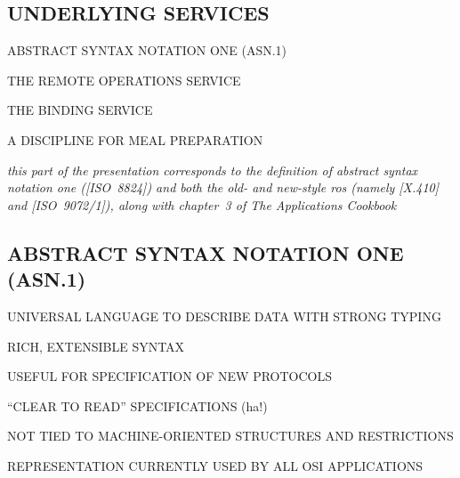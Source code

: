 
\begin{bwslide}
\part	{UNDERLYING SERVICES}\bf

\begin{nrtc}
\item	ABSTRACT SYNTAX NOTATION ONE (ASN.1)

\item	THE REMOTE OPERATIONS SERVICE

\item	THE BINDING SERVICE

\item	A DISCIPLINE FOR MEAL PREPARATION
\end{nrtc}
\end{bwslide}


\begin{note}\em
this part of the presentation corresponds to
the definition of abstract syntax notation one ([ISO~8824])
and both the old- and new-style ros
(namely [X.410] and [ISO~9072/1]),
along with chapter~3 of The Applications Cookbook
\end{note}


\begin{bwslide}
\part*	{ABSTRACT SYNTAX NOTATION ONE (ASN.1)}\bf

\begin{nrtc}
\item	UNIVERSAL LANGUAGE TO DESCRIBE DATA WITH STRONG TYPING

\item	RICH, EXTENSIBLE SYNTAX

\item	USEFUL FOR SPECIFICATION OF NEW PROTOCOLS
    \begin{nrtc}
    \item	``CLEAR TO READ'' SPECIFICATIONS (ha!)

    \item	NOT TIED TO MACHINE-ORIENTED STRUCTURES AND RESTRICTIONS
    \end{nrtc}

\item	REPRESENTATION CURRENTLY USED BY ALL OSI APPLICATIONS
\end{nrtc}
\end{bwslide}


